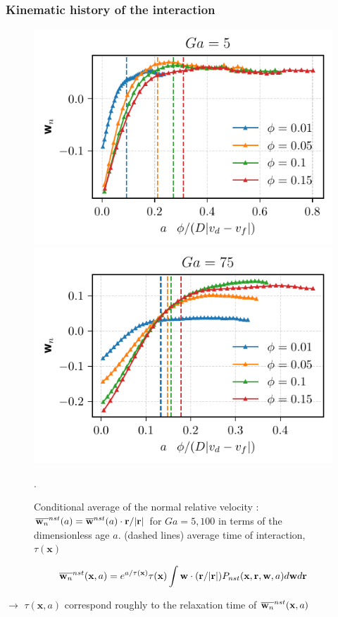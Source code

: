 \documentclass{sintefbeamer}
\begin{document}
\begin{frame}
  \frametitle{Kinematic history of the interaction}
    \begin{figure}
        \includegraphics[height=0.24\textwidth]{image/HOMOGENEOUS/fDrop/ur_a_Ga_5.pdf}
        \includegraphics[height=0.24\textwidth]{image/HOMOGENEOUS/fDrop/ur_a_Ga_75.pdf}
        \caption{Conditional average of the normal relative velocity : $\overline{\textbf{w}_n}^{nst}(a) = \overline{\textbf{w}}^{nst}(a)\cdot \textbf{r}/|\textbf{r}|$ for $Ga = 5,100$ in terms of the dimensionless age $a$.
        (dashed lines) average time of interaction, $\tau(\textbf{x})$}. 
    \end{figure}
  \begin{equation*}
     \overline{\textbf{w}_n}^{nst}(\textbf{x},a)
    = e^{a/\tau(\textbf{x})}\tau(\textbf{x})\int \textbf{w}\cdot(\textbf{r}/|\textbf{r}|) P_{nst}(\textbf{x},\textbf{r},\textbf{w},a) d\textbf{w}d\textbf{r}
  \end{equation*}

$\rightarrow$ $\tau(\textbf{x},a)$ correspond roughly to the relaxation time of $\overline{\textbf{w}_n}^{nst}(\textbf{x},a)$
\end{frame}
\end{document}
